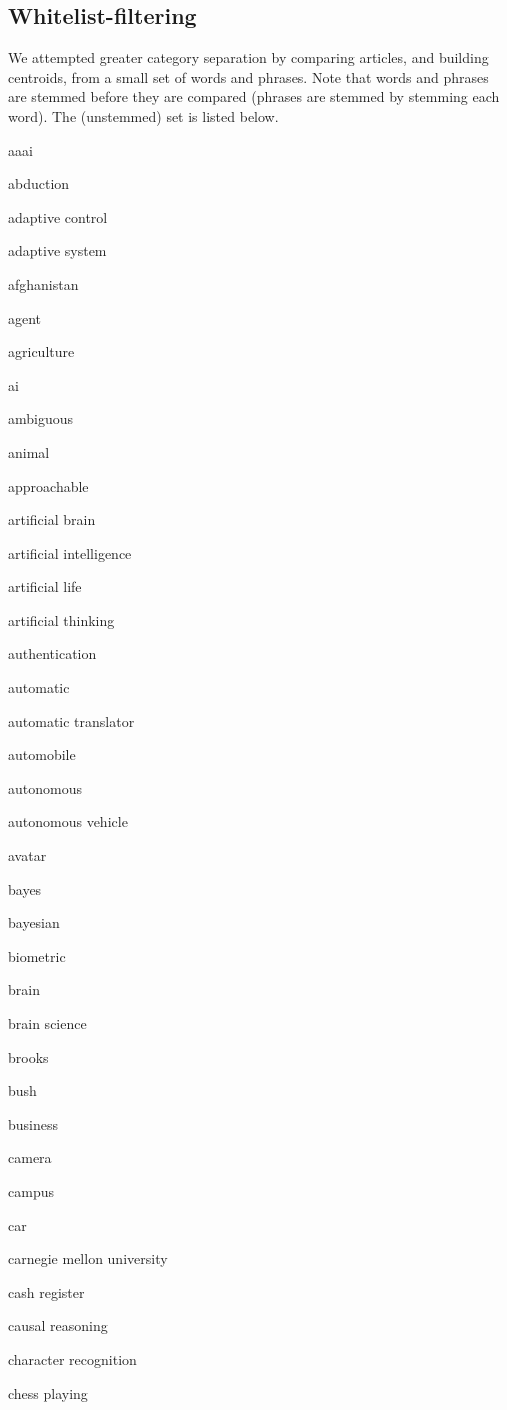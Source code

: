 \documentclass{article}
\begin{document}
\subsection{Whitelist-filtering}

We attempted greater category separation by comparing articles, and building
centroids, from a small set of words and phrases. Note that words and phrases
are stemmed before they are compared (phrases are stemmed by stemming each
word). The (unstemmed) set is listed below.

\begin{multicols}{3}
aaai

abduction

adaptive control

adaptive system

afghanistan

agent

agriculture

ai

ambiguous

animal

approachable

artificial brain

artificial intelligence

artificial life

artificial thinking

authentication

automatic

automatic translator

automobile

autonomous

autonomous vehicle

avatar

bayes

bayesian

biometric

brain

brain science

brooks

bush

business

camera

campus

car

carnegie mellon university

cash register

causal reasoning

character recognition

chess playing


\end{multicols}
\end{document}
